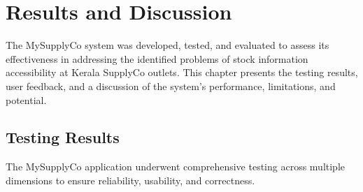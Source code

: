 \chapter{Results and Discussion}

The MySupplyCo system was developed, tested, and evaluated to assess its effectiveness in addressing the identified problems of stock information accessibility at Kerala SupplyCo outlets. This chapter presents the testing results, user feedback, and a discussion of the system's performance, limitations, and potential.

\section{Testing Results}

The MySupplyCo application underwent comprehensive testing across multiple dimensions to ensure reliability, usability, and correctness.

